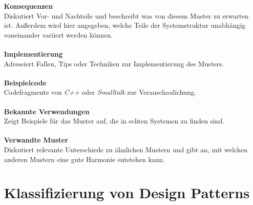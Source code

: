 \documentclass[fontsize=11pt,a4paper,final]{scrreprt}[2003/01/01]
\begin{document}
\textbf{Konsequenzen} \\
Diskutiert Vor- und Nachteile und beschreibt was von diesem Muster zu erwarten ist. Außerdem wird hier angegeben, welche Teile der Systemstruktur unabhängig voneinander variiert werden können. \\ \\
\textbf{Implementierung} \\
Adressiert Fallen, Tips oder Techniken zur Implementierung des Musters. \\ \\
\textbf{Beispielcode} \\
Codefragmente von \textit{C++} oder \textit{Smalltalk} zur Veranschaulichung. \\ \\
\textbf{Bekannte Verwendungen} \\
Zeigt Beispiele für das Muster auf, die in echten Systemen zu finden sind. \\ \\
\textbf{Verwandte Muster} \\
Diskutiert relevante Unterschiede zu ähnlichen Mustern und gibt an, mit welchen anderen Mustern eine gute Harmonie entstehen kann.
\section{Klassifizierung von Design Patterns}\label{se:Klassifizierung}
\end{document}
